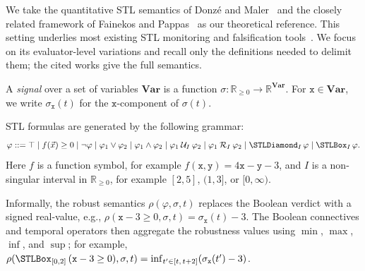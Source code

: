 \begin{table}[t]
\centering
\caption{Representative \emph{implicit choices} in implementing STL robustness evaluation.
These choices can affect both reported
robustness values and the accepted class of formula-trace inputs.
\ifextended
  {Further formal details are given in Appendix~\ref{sec:formal}.}
  {Further formal details are given in the extended
   version~\cite{sato2026tidystlExtended}.}}
\label{tab:divergence}


\end{table}


We take the quantitative STL semantics of Donz\'e and
Maler~\cite{donze2010robust} and the closely related framework of Fainekos and
Pappas~\cite{fainekos2009robustness} as our theoretical reference. This setting
underlies most existing STL monitoring and falsification
tools~\cite{ernst2021archcomp}. We focus on its evaluator-level variations and
recall only the definitions needed to delimit them; the cited works give the
full semantics.

\begin{definition}[Signal]
\label{def:signal}
A \emph{signal} over a set of variables $\mathbf{Var}$ is a function
$\sigma \colon \mathbb{R}_{\geq 0} \to \mathbb{R}^{\mathbf{Var}}$.
For $\mathtt{x}\in\mathbf{Var}$, we write $\sigma_{\mathtt{x}}(t)$ for the
$\mathtt{x}$-component of $\sigma(t)$.
\end{definition}

\begin{definition}
\label{def:stl}
STL formulas are generated by the following grammar:
{%
\setlength{\abovedisplayskip}{4pt}%
\setlength{\belowdisplayskip}{4pt}%
\[%
  \varphi ::= {}
    \top \mid f(\vec{x}) \geq 0
    \mid \neg\varphi \mid \varphi_1 \vee \varphi_2
    \mid \varphi_1 \wedge \varphi_2
  \mid \varphi_1 \Until_I \varphi_2
    \mid \varphi_1 \Release_I \varphi_2
    \mid \Eventually_I\varphi \mid \Always_I\varphi.
\]%
}%
Here $f$ is a function symbol, for example
$f(\mathtt{x}, \mathtt{y}) = 4\mathtt{x} - \mathtt{y} - 3$, and $I$ is a non-singular interval in $\mathbb{R}_{\geq 0}$, for example $[2,5]$, $(1,3]$, or $[0,\infty)$.
\end{definition}

\noindent
Informally, the robust semantics $\rho(\varphi, \sigma, t)$ replaces the Boolean
verdict with a signed real-value,
e.g., $\rho(\mathtt{x} - 3 \geq 0, \sigma, t) = \sigma_\mathtt{x}(t) - 3$.
The Boolean connectives and temporal operators then aggregate the robustness values using $\min$, $\max$, $\inf$, and $\sup$; for example,
$\rho(\Always_{[0,2]}\,(\mathtt{x} - 3 \geq 0), \sigma, t)
  = \inf_{t' \in [t,\,t+2]} (\sigma_\mathtt{x}(t') - 3)$.

